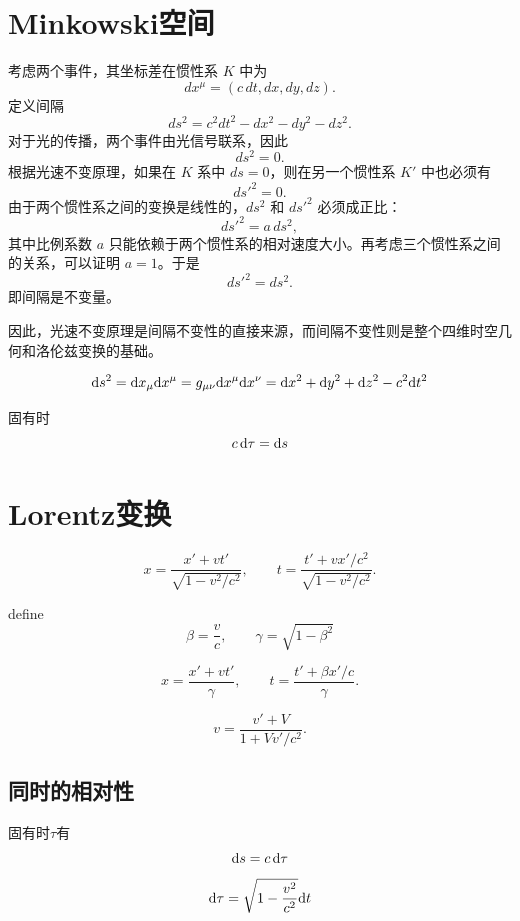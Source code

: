 \documentclass[a4paper]{report}
\begin{document}
\section{Minkowski空间}
考虑两个事件，其坐标差在惯性系 \(K\) 中为
\[
dx^\mu = (c\,dt, dx, dy, dz).
\]
定义间隔
\[
ds^2 = c^2 dt^2 - dx^2 - dy^2 - dz^2.
\]
对于光的传播，两个事件由光信号联系，因此
\[
ds^2 = 0.
\]
根据光速不变原理，如果在 \(K\) 系中 \(ds=0\)，则在另一个惯性系 \(K'\) 中也必须有
\[
ds'^2 = 0.
\]
由于两个惯性系之间的变换是线性的，\(ds^2\) 和 \(ds'^2\) 必须成正比：
\[
ds'^2 = a\, ds^2,
\]
其中比例系数 \(a\) 只能依赖于两个惯性系的相对速度大小。再考虑三个惯性系之间的关系，可以证明 \(a=1\)。于是
\[
ds'^2 = ds^2.
\]
即间隔是不变量。

因此，光速不变原理是间隔不变性的直接来源，而间隔不变性则是整个四维时空几何和洛伦兹变换的基础。

\begin{equation}
    \mathrm{d} s^2 = \mathrm{d} x_\mu \mathrm{d} x^\mu = g_{\mu\nu}\mathrm{d} x^\mu \mathrm{d} x^\nu = \mathrm{d} x^2+\mathrm{d} y^2 + \mathrm{d} z^2 -c^2 \mathrm{d} t^2
\end{equation}



固有时
\begin{equation}
   c\, \mathrm{d} \tau = \mathrm{d} s
\end{equation}

\section{Lorentz变换}

\begin{equation}
    x = \frac{x' + v t'}{\sqrt{1 - v^2/c^2}},
\qquad
t = \frac{t' + v x'/c^2}{\sqrt{1 - v^2/c^2}}.
\end{equation}

define 
\begin{equation}
    \beta = \frac{v}{c},\qquad \gamma = \sqrt{1-\beta^2}
\end{equation}

\begin{equation}
    x = \frac{x' + v t'}{\gamma},
\qquad
t = \frac{t' + \beta x'/c}{\gamma}.
\end{equation}

\begin{equation}
    v = \frac{v' + V}{1 + V v'/c^2}.
\end{equation}
\subsection*{同时的相对性}
固有时$\tau$有
\begin{equation}
   \mathrm{d} s = c \,\mathrm{d} \tau 
\end{equation}
\begin{equation}
    \mathrm{d} \tau = \sqrt{1-\frac{v^2}{c^2}}\mathrm{d} t
\end{equation}
\end{document}
